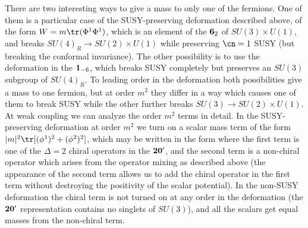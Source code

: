  There are two interesting ways to give a mass to only one of the
 fermions. One of them is a particular case of the SUSY-preserving
 deformation described above, of the form $W = m \tr(\Phi^1 \Phi^1)$,
 which is an element of the ${\bf 6}_{2}$ of $SU(3)\times U(1)$, and
 breaks $SU(4)_R \to SU(2)\times U(1)$ while preserving $\cn=1$ SUSY
 (but breaking the conformal invariance). The other possibility is to
 use the deformation in the ${\bf 1}_{-6}$, which breaks SUSY
 completely but preserves an $SU(3)$ subgroup of $SU(4)_R$. To leading
 order in the deformation both possibilities give a mass to one
 fermion, but at order $m^2$ they differ in a way which causes one of
 them to break SUSY while the other further
 breaks $SU(3)\to SU(2)\times
 U(1)$. At weak coupling we can analyze the order $m^2$ terms in
 detail. In the SUSY-preserving deformation at order $m^2$ we turn on a
 scalar mass term of the form $|m|^2 \tr[(\phi^1)^2+(\phi^2)^2]$, which
 may be written in the form 
 where the first term is one of
 the $\Delta=2$ chiral operators in the $\bf 20'$, and the second term
 is a non-chiral operator which arises from the operator mixing as
 described above (the appearance of the second term allows us to add
 the chiral operator in the first term without destroying the
 positivity of the scalar potential). In the non-SUSY deformation the
 chiral term is not turned on at any order in the deformation (the $\bf
 20'$ representation contains no singlets of $SU(3)$), and all the
 scalars get equal masses from the non-chiral term.

